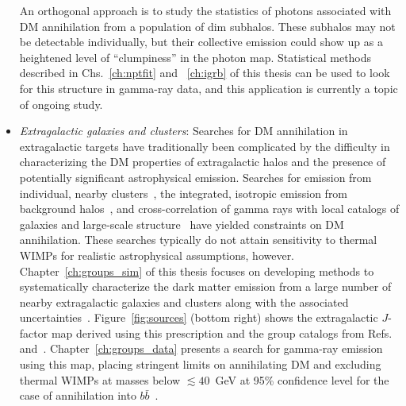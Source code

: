 \begin{itemize}
An orthogonal approach is to study the statistics of photons associated with DM annihilation from a population of dim subhalos. These subhalos may not be detectable individually, but their collective emission could show up as a heightened level of ``clumpiness'' in the photon map. Statistical methods described in Chs.~\ref{ch:nptfit} and ~\ref{ch:igrb} of this thesis can be used to look for this structure in gamma-ray data, and this application is currently a topic of ongoing study.

\item \emph{Extragalactic galaxies and clusters}: Searches for DM annihilation in extragalactic targets have traditionally been complicated by the difficulty in characterizing the DM properties of extragalactic halos and the presence of potentially significant astrophysical emission. Searches for emission from individual, nearby clusters~\cite{Ackermann:2015fdi}, the integrated, isotropic emission from background halos~\cite{Ackermann:2015tah,Ajello:2015mfa,Cholis:2013ena,DiMauro:2015tfa}, and cross-correlation of gamma rays with local catalogs of galaxies and large-scale structure~\cite{Ando:2013xwa,Ando:2014aoa,Ando:2016ang,Cuoco:2015rfa,Regis:2015zka,Xia:2015wka} have yielded constraints on DM annihilation. These searches typically do not attain sensitivity to thermal WIMPs for realistic astrophysical assumptions, however. Chapter~\ref{ch:groups_sim} of this thesis focuses on developing methods to systematically characterize the dark matter emission from a large number of nearby extragalactic galaxies and clusters along with the associated uncertainties~\cite{Lisanti:2017qoz}. Figure~\ref{fig:sources} (bottom right) shows the extragalactic $J$-factor map derived using this prescription and the group catalogs from Refs.~\cite{Tully:2015opa} and~\cite{2017ApJ...843...16K}. Chapter~\ref{ch:groups_data} presents a search for gamma-ray emission using this map, placing stringent limits on annihilating DM and excluding thermal WIMPs at masses below $\lesssim 40$~GeV at 95\% confidence level for the case of annihilation into $b\bar b$~\cite{Lisanti:2017qlb}.
\end{itemize}

